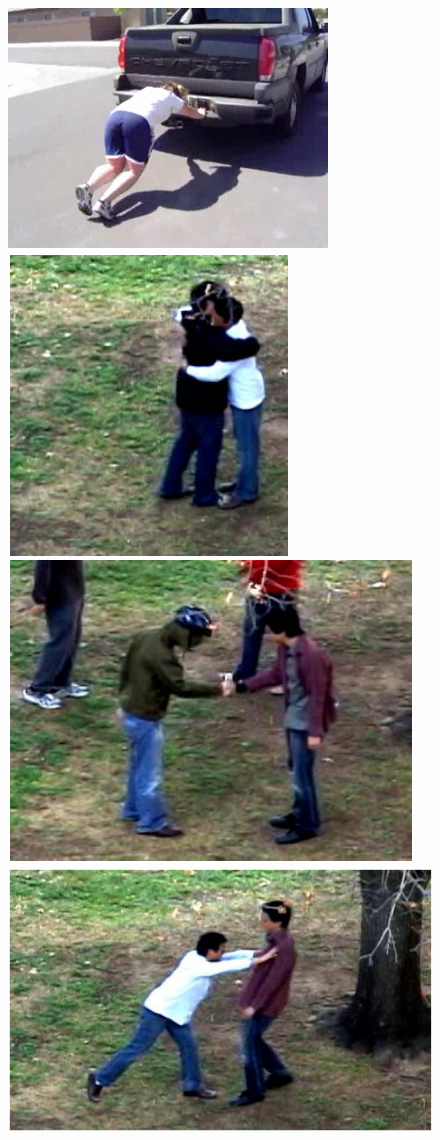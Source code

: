 \documentclass[10pt,twocolumn,letterpaper]{article}
\begin{document}
\begin{figure}[!t]
\begin{center}
\includegraphics[scale=0.19]{figures/dataset_thumb/hmdb/class6.png} \\
\includegraphics[scale=0.32]{figures/dataset_thumb/uti/crop_class1.pdf} 
\includegraphics[scale=0.32]{figures/dataset_thumb/uti/crop_class2.pdf} 
\includegraphics[scale=0.32]{figures/dataset_thumb/uti/crop_class3.pdf} 

\end{center}
\end{figure}
\end{document}
